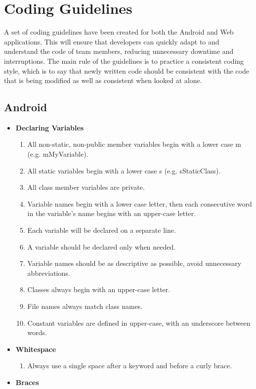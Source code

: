 \documentclass[11pt,a4paper]{article}
\begin{document}
\section{Coding Guidelines}
\label{sec:codingguidelines}
A set of coding guidelines have been created for both the Android and Web applications. This will ensure that developers can quickly adapt to and understand the code of team members, reducing unnecessary downtime and interruptions. The main rule of the guidelines is to practice a consistent coding style, which is to say that newly written code should be consistent with the code that is being modified as well as consistent when looked at alone.
\subsection{Android}
\begin{itemize}
\item \textbf{Declaring Variables}
	\begin{enumerate}
	\item All non-static, non-public member variables begin with a lower case m (e.g. mMyVariable).
	\item All static variables begin with a lower case s (e.g. sStaticClass).
	\item All class member variables are private.
	\item Variable names begin with a lower case letter, then each consecutive word in the variable's name begins with an upper-case letter.
	\item Each variable will be declared on a separate line.
	\item A variable should be declared only when needed.
	\item Variable names should be as descriptive as possible, avoid unnecessary abbreviations.
	\item Classes always begin with an upper-case letter.
	\item File names always match class names.
	\item Constant variables are defined in upper-case, with an underscore between words.
	\end{enumerate}
\item \textbf{Whitespace}
	\begin{enumerate}
	\item Always use a single space after a keyword and before a curly brace.
	\end{enumerate}
\item \textbf{Braces}

\end{itemize}
\end{document}

